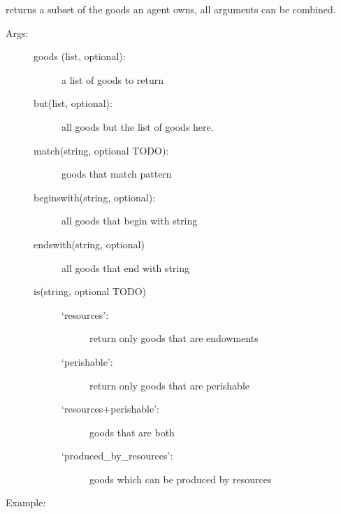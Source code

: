 \documentclass[letterpaper,10pt,english]{sphinxmanual}
\begin{document}
\begin{fulllineitems}
\begin{fulllineitems}
\end{fulllineitems}


\begin{fulllineitems}
\label{Agent_class:abce.Agent.possessions_filter}
returns a subset of the goods an agent owns, all arguments
can be combined.
\begin{description}
\item[{Args:}] \leavevmode\begin{description}
\item[{goods (list, optional):}] \leavevmode
a list of goods to return

\item[{but(list, optional):}] \leavevmode
all goods but the list of goods here.

\item[{match(string, optional TODO):}] \leavevmode
goods that match pattern

\item[{beginswith(string, optional):}] \leavevmode
all goods that begin with string

\item[{endswith(string, optional)}] \leavevmode
all goods that end with string

\item[{is(string, optional TODO)}] \leavevmode\begin{description}
\item[{`resources':}] \leavevmode
return only goods that are endowments

\item[{`perishable':}] \leavevmode
return only goods that are perishable

\item[{`resources+perishable':}] \leavevmode
goods that are both

\item[{`produced\_by\_resources':}] \leavevmode
goods which can be produced by resources

\end{description}

\end{description}

\end{description}

Example:


\end{fulllineitems}
\end{fulllineitems}
\end{document}
